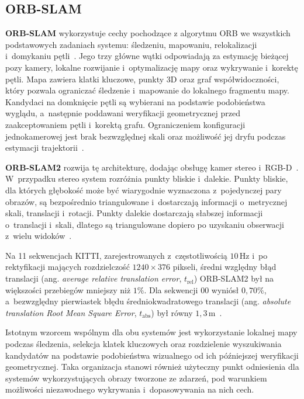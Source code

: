 \subsection{ORB-SLAM}
\label{subsec:literatura_orbslam}

\textbf{ORB-SLAM} wykorzystuje cechy pochodzące z algorytmu ORB we wszystkich podstawowych zadaniach systemu: śledzeniu, mapowaniu, relokalizacji i~domykaniu pętli~\cite{murartal2015orbslam}. Jego trzy główne wątki odpowiadają za estymację bieżącej pozy kamery, lokalne rozwijanie i~optymalizację mapy oraz wykrywanie i~korektę pętli. Mapa zawiera klatki kluczowe, punkty 3D oraz graf współwidoczności, który pozwala ograniczać śledzenie i~mapowanie do lokalnego fragmentu mapy. Kandydaci na domknięcie pętli są wybierani na podstawie podobieństwa wyglądu, a~następnie poddawani weryfikacji geometrycznej przed zaakceptowaniem pętli i~korektą grafu. Ograniczeniem konfiguracji jednokamerowej jest brak bezwzględnej skali oraz możliwość jej dryfu podczas estymacji trajektorii~\cite{murartal2015orbslam}.

\textbf{ORB-SLAM2} rozwija tę architekturę, dodając obsługę kamer stereo i~RGB-D~\cite{murartal2017orbslam2}. W~przypadku stereo system rozróżnia punkty bliskie i~dalekie. Punkty bliskie, dla których głębokość może być wiarygodnie wyznaczona z~pojedynczej pary obrazów, są bezpośrednio triangulowane i~dostarczają informacji o~metrycznej skali, translacji i~rotacji. Punkty dalekie dostarczają słabszej informacji o~translacji i~skali, dlatego są triangulowane dopiero po uzyskaniu obserwacji z~wielu widoków~\cite{murartal2017orbslam2}.

Na 11 sekwencjach KITTI, zarejestrowanych z~częstotliwością $10\,\mathrm{Hz}$ i~po rektyfikacji mających rozdzielczość $1240\times376$ pikseli, średni względny błąd translacji (ang. \textit{average relative translation error}, $t_{\mathrm{rel}}$) ORB-SLAM2 był na większości przebiegów mniejszy niż $1\%$. Dla sekwencji 00 wyniósł $0{,}70\%$, a~bezwzględny pierwiastek błędu średniokwadratowego translacji (ang. \textit{absolute translation Root Mean Square Error}, $t_{\mathrm{abs}}$) był równy $1{,}3\,\mathrm{m}$~\cite{geiger2012kitti,murartal2017orbslam2}.

Istotnym wzorcem wspólnym dla obu systemów jest wykorzystanie lokalnej mapy podczas śledzenia, selekcja klatek kluczowych oraz rozdzielenie wyszukiwania kandydatów na podstawie podobieństwa wizualnego od ich późniejszej weryfikacji geometrycznej. Taka organizacja stanowi również użyteczny punkt odniesienia dla systemów wykorzystujących obrazy tworzone ze zdarzeń, pod warunkiem możliwości niezawodnego wykrywania i~dopasowywania na nich cech.


